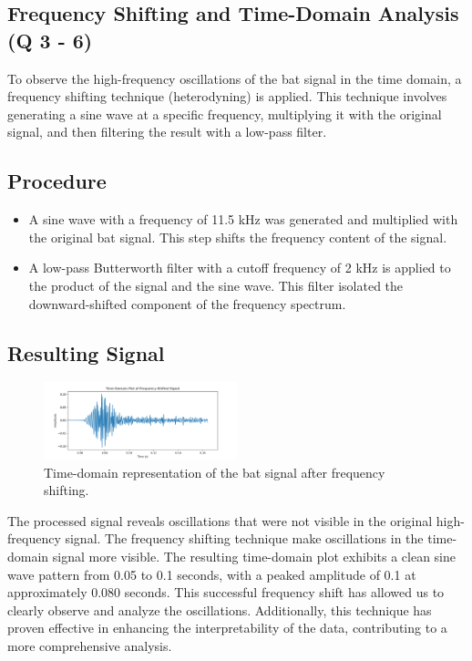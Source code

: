 \documentclass[twocolumn]{article}[ht]
\begin{document}
\subsection{Frequency Shifting and Time-Domain Analysis (Q 3 - 6)}
To observe the high-frequency oscillations of the bat signal in the time domain, a frequency shifting technique (heterodyning) is applied. This technique involves generating a sine wave at a specific frequency, multiplying it with the original signal, and then filtering the result with a low-pass filter.

\subsection*{Procedure}
\begin{itemize}
    \item A sine wave with a frequency of 11.5 kHz was generated and multiplied with the original bat signal. This step shifts the frequency content of the signal.
    
    \item A low-pass Butterworth filter with a cutoff frequency of 2 kHz is applied to the product of the signal and the sine wave. This filter isolated the downward-shifted component of the frequency spectrum.
\end{itemize}

\subsection*{Resulting Signal}
\begin{figure}[ht]
\centering
\includegraphics[width=0.5\textwidth]{shifted_time_domain.png}
\caption{Time-domain representation of the bat signal after frequency shifting.}
\end{figure}

The processed signal reveals oscillations that were not visible in the original high-frequency signal. The frequency shifting technique make oscillations in the time-domain signal more visible. The resulting time-domain plot exhibits a clean sine wave pattern from 0.05 to 0.1 seconds, with a peaked amplitude of 0.1 at approximately 0.080 seconds. This successful frequency shift has allowed us to clearly observe and analyze the oscillations. Additionally, this technique has proven effective in enhancing the interpretability of the data, contributing to a more comprehensive analysis.
\end{document}
